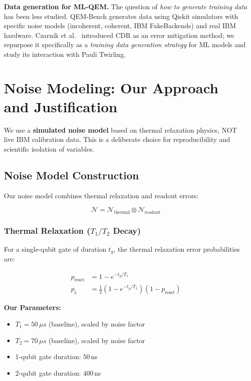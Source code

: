 \documentclass[11pt, a4paper]{article}
\begin{document}
\textbf{Data generation for ML-QEM.}
The question of \emph{how to generate training data} has been less studied.
QEM-Bench generates data using Qiskit simulators with specific noise models
(incoherent, coherent, IBM FakeBackends) and real IBM hardware. Czarnik et
al.~\cite{czarnik2021cdr} introduced CDR as an error mitigation method;
we repurpose it specifically as a \emph{training data generation strategy}
for ML models and study its interaction with Pauli Twirling.

\section{Noise Modeling: Our Approach and Justification}
\label{sec:noise}

\begin{keyinsight}
We use a \textbf{simulated noise model} based on thermal relaxation physics,
NOT live IBM calibration data. This is a deliberate choice for reproducibility
and scientific isolation of variables.
\end{keyinsight}

\subsection{Noise Model Construction}

Our noise model combines thermal relaxation and readout errors:

\begin{equation}
\mathcal{N} = \mathcal{N}_{\text{thermal}} \otimes \mathcal{N}_{\text{readout}}
\end{equation}

\subsubsection{Thermal Relaxation ($T_1/T_2$ Decay)}

For a single-qubit gate of duration $t_g$, the thermal relaxation error
probabilities are:

\begin{align}
p_{\text{reset}} &= 1 - e^{-t_g/T_1} \\
p_{\text{z}} &= \frac{1}{2}(1 - e^{-t_g/T_2})(1 - p_{\text{reset}})
\end{align}

\textbf{Our Parameters:}
\begin{itemize}
    \item $T_1 = 50\,\mu s$ (baseline), scaled by noise factor
    \item $T_2 = 70\,\mu s$ (baseline), scaled by noise factor
    \item 1-qubit gate duration: $50\,$ns
    \item 2-qubit gate duration: $400\,$ns
\end{itemize}
\end{document}
